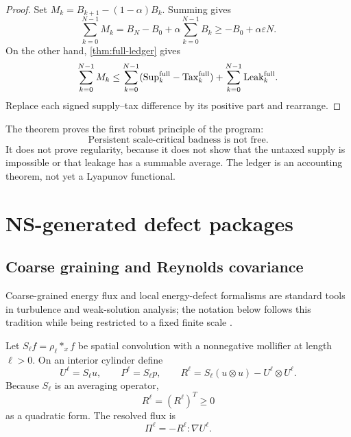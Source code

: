 \documentclass[11pt]{article}
\numberwithin{equation}{section}
\theoremstyle{remark}
\newcommand{\eps}{\varepsilon}
\newcommand{\Sup}{\mathrm{Sup}}
\newcommand{\Tax}{\mathrm{Tax}}
\newcommand{\Leak}{\mathrm{Leak}}
\begin{document}
\begin{proof}
Set $M_k=B_{k+1}-(1-\alpha)B_k$. Summing gives
\[
\sum_{k=0}^{N-1}M_k
=B_N-B_0+\alpha\sum_{k=0}^{N-1}B_k
\ge -B_0+\alpha\eps N.
\]
On the other hand, \cref{thm:full-ledger} gives
\[
\sum_{k=0}^{N-1}M_k
\le
\sum_{k=0}^{N-1}
(\Sup_k^{\rm full}-\Tax_k^{\rm full})
+
\sum_{k=0}^{N-1}\Leak_k^{\rm full}.
\]
Replace each signed supply--tax difference by its positive part and rearrange.
\end{proof}

The theorem proves the first robust principle of the program:
\begin{equation}\label{eq:not-free}
\boxed{\text{Persistent scale-critical badness is not free.}}
\end{equation}
It does not prove regularity, because it does not show that the untaxed supply is impossible or that leakage has a summable average. The ledger is an accounting theorem, not yet a Lyapunov functional.

\section{NS-generated defect packages}\label{sec:packages}

\subsection{Coarse graining and Reynolds covariance}

Coarse-grained energy flux and local energy-defect formalisms are standard tools in turbulence and weak-solution analysis; the notation below follows this tradition while being restricted to a fixed finite scale \cite{ConstantinETiti1994,Eyink1994,DuchonRobert2000,LeslieShvydkoy2018}.

Let $S_\ell f=\rho_\ell*_xf$ be spatial convolution with a nonnegative mollifier at length $\ell>0$. On an interior cylinder define
\begin{equation}\label{eq:coarse-package}
U^\ell=S_\ell u,
\qquad
P^\ell=S_\ell p,
\qquad
R^\ell=S_\ell(u\otimes u)-U^\ell\otimes U^\ell.
\end{equation}
Because $S_\ell$ is an averaging operator,
\begin{equation}\label{eq:R-positive}
R^\ell=(R^\ell)^T\ge0
\end{equation}
as a quadratic form. The resolved flux is
\begin{equation}\label{eq:Pi-def}
\Pi^\ell=-R^\ell:\nabla U^\ell.
\end{equation}
\end{document}
